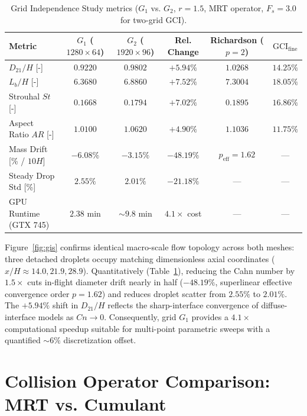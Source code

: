 \documentclass[11pt,a4paper]{article}
\begin{document}
\begin{table}[H]
\caption{Grid Independence Study metrics ($G_1$ vs. $G_2$, $r = 1.5$, MRT operator, $F_s = 3.0$ for two-grid GCI).}
\label{tab:gis}
\hspace{-1.5cm}
\begin{tabular}{@{}lccccc@{}}
\toprule
\textbf{Metric} & \textbf{$G_1$ ($1280 \times 64$)} & \textbf{$G_2$ ($1920 \times 96$)} & \textbf{Rel. Change} & \textbf{Richardson ($p=2$)} & \textbf{$\mathrm{GCI}_{\mathrm{fine}}$} \\
\midrule
$D_{21} / H$ [-] & $0.9220$ & $0.9802$ & $+5.94\%$ & $1.0268$ & $14.25\%$ \\
$L_b / H$ [-] & $6.3680$ & $6.8860$ & $+7.52\%$ & $7.3004$ & $18.05\%$ \\
Strouhal $St$ [-] & $0.1668$ & $0.1794$ & $+7.02\%$ & $0.1895$ & $16.86\%$ \\
Aspect Ratio $AR$ [-] & $1.0100$ & $1.0620$ & $+4.90\%$ & $1.1036$ & $11.75\%$ \\
\midrule
Mass Drift [\% / $10H$] & $-6.08\%$ & $-3.15\%$ & $-48.19\%$ & $p_{\mathrm{eff}} = 1.62$ & --- \\
Steady Drop Std [\%] & $2.55\%$ & $2.01\%$ & $-21.18\%$ & --- & --- \\
GPU Runtime (GTX 745) & $2.38\text{ min}$ & $\sim 9.8\text{ min}$ & $4.1\times$ cost & --- & --- \\
\bottomrule
\end{tabular}
\end{table}

Figure~\ref{fig:gis} confirms identical macro-scale flow topology across both meshes: three detached droplets occupy matching dimensionless axial coordinates ($x/H \approx 14.0, 21.9, 28.9$). Quantitatively (Table~\ref{tab:gis}), reducing the Cahn number by $1.5\times$ cuts in-flight diameter drift nearly in half ($-48.19\%$, superlinear effective convergence order $p = 1.62$) and reduces droplet scatter from $2.55\%$ to $2.01\%$. The $+5.94\%$ shift in $D_{21}/H$ reflects the sharp-interface convergence of diffuse-interface models as $Cn \to 0$. Consequently, grid $G_1$ provides a $4.1\times$ computational speedup suitable for multi-point parametric sweeps with a quantified $\sim 6\%$ discretization offset.

\section{Collision Operator Comparison: MRT vs. Cumulant}
\end{document}
